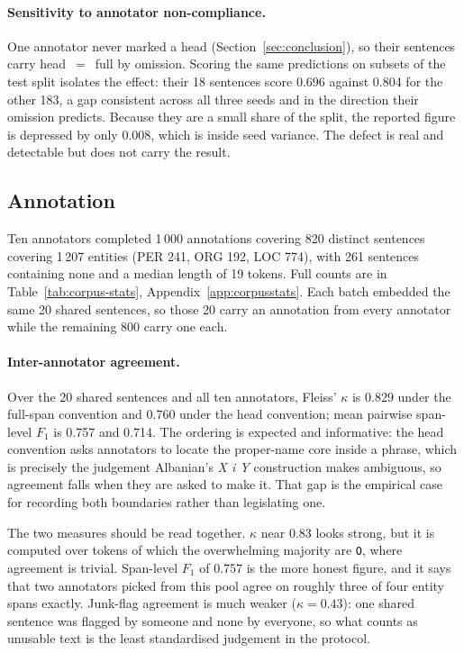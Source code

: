 \paragraph{Sensitivity to annotator non-compliance.}
One annotator never marked a head (Section~\ref{sec:conclusion}), so their sentences carry head~$=$~full by omission. Scoring the same predictions on subsets of the test split isolates the effect: their 18 sentences score 0.696 against 0.804 for the other 183, a gap consistent across all three seeds and in the direction their omission predicts. Because they are a small share of the split, the reported figure is depressed by only 0.008, which is inside seed variance. The defect is real and detectable but does not carry the result.

\subsection{Annotation}
\label{sec:results:annotation}

Ten annotators completed 1\,000 annotations covering 820 distinct sentences
covering 1\,207 entities (PER 241, ORG 192, LOC 774), with 261 sentences containing none
and a median length of 19 tokens. Full counts are in Table~\ref{tab:corpus-stats},
Appendix~\ref{app:corpusstats}. Each batch embedded the same 20 shared sentences, so those
20 carry an annotation from every annotator while the remaining 800 carry one each.



\paragraph{Inter-annotator agreement.}
Over the 20 shared sentences and all ten annotators, Fleiss' $\kappa$ is 0.829 under the full-span convention and 0.760 under the head convention; mean pairwise span-level $F_1$ is 0.757 and 0.714. The ordering is expected and informative: the head convention asks annotators to locate the proper-name core inside a phrase, which is precisely the judgement Albanian's \emph{X i Y} construction makes ambiguous, so agreement falls when they are asked to make it. That gap is the empirical case for recording both boundaries rather than legislating one.

The two measures should be read together. $\kappa$ near 0.83 looks strong, but it is computed over tokens of which the overwhelming majority are \texttt{O}, where agreement is trivial. Span-level $F_1$ of 0.757 is the more honest figure, and it says that two annotators picked from this pool agree on roughly three of four entity spans exactly. Junk-flag agreement is much weaker ($\kappa = 0.43$): one shared sentence was flagged by someone and none by everyone, so what counts as unusable text is the least standardised judgement in the protocol.

